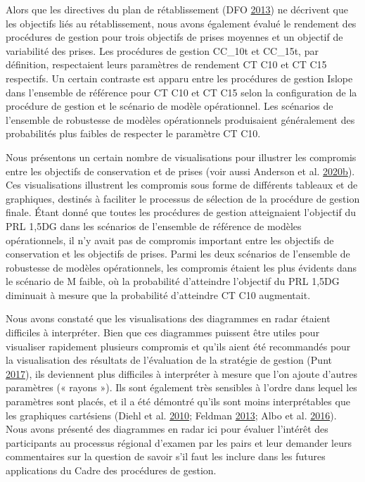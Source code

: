 \documentclass[11pt]{book}
\begin{document}
Alors que les directives du plan de rétablissement (DFO \protect\hyperlink{ref-dfo2013}{2013}) ne décrivent que les objectifs liés au rétablissement, nous avons également évalué le rendement des procédures de gestion pour trois objectifs de prises moyennes et un objectif de variabilité des prises. Les procédures de gestion CC\_10t et CC\_15t, par définition, respectaient leurs paramètres de rendement CT C10 et CT C15 respectifs. Un certain contraste est apparu entre les procédures de gestion Islope dans l'ensemble de référence pour CT C10 et CT C15 selon la configuration de la procédure de gestion et le scénario de modèle opérationnel. Les scénarios de l'ensemble de robustesse de modèles opérationnels produisaient généralement des probabilités plus faibles de respecter le paramètre CT C10.

Nous présentons un certain nombre de visualisations pour illustrer les compromis entre les objectifs de conservation et de prises (voir aussi Anderson et al. \protect\hyperlink{ref-anderson2020gfmp}{2020}\protect\hyperlink{ref-anderson2020gfmp}{b}). Ces visualisations illustrent les compromis sous forme de différents tableaux et de graphiques, destinés à faciliter le processus de sélection de la procédure de gestion finale. Étant donné que toutes les procédures de gestion atteignaient l'objectif du PRL 1,5DG dans les scénarios de l'ensemble de référence de modèles opérationnels, il n'y avait pas de compromis important entre les objectifs de conservation et les objectifs de prises. Parmi les deux scénarios de l'ensemble de robustesse de modèles opérationnels, les compromis étaient les plus évidents dans le scénario de M faible, où la probabilité d'atteindre l'objectif du PRL 1,5DG diminuait à mesure que la probabilité d'atteindre CT C10 augmentait.

Nous avons constaté que les visualisations des diagrammes en radar étaient difficiles à interpréter. Bien que ces diagrammes puissent être utiles pour visualiser rapidement plusieurs compromis et qu'ils aient été recommandés pour la visualisation des résultats de l'évaluation de la stratégie de gestion (Punt \protect\hyperlink{ref-punt2017}{2017}), ils deviennent plus difficiles à interpréter à mesure que l'on ajoute d'autres paramètres (« rayons »). Ils sont également très sensibles à l'ordre dans lequel les paramètres sont placés, et il a été démontré qu'ils sont moins interprétables que les graphiques cartésiens (Diehl et al. \protect\hyperlink{ref-diehl2010}{2010}; Feldman \protect\hyperlink{ref-feldman2013}{2013}; Albo et al. \protect\hyperlink{ref-albo2016}{2016}). Nous avons présenté des diagrammes en radar ici pour évaluer l'intérêt des participants au processus régional d'examen par les pairs et leur demander leurs commentaires sur la question de savoir s'il faut les inclure dans les futures applications du Cadre des procédures de gestion.
\end{document}
